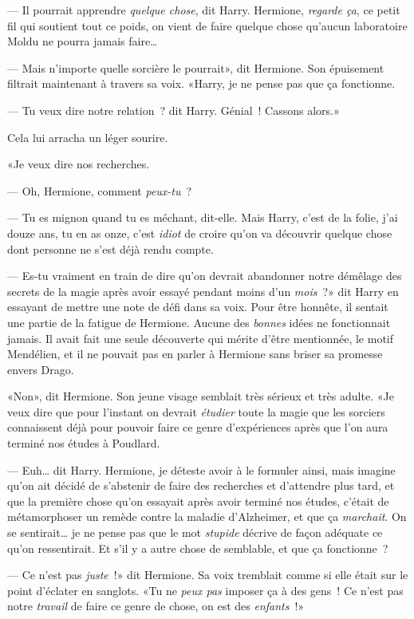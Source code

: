 --- Il pourrait apprendre \emph{quelque chose}, dit Harry. Hermione, \emph{regarde ça}, ce petit fil qui soutient tout ce poids, on vient de faire quelque chose qu'aucun laboratoire Moldu ne pourra jamais faire…

--- Mais n'importe quelle sorcière le pourrait», dit Hermione. Son épuisement filtrait maintenant à travers sa voix. «Harry, je ne pense pas que ça fonctionne.

--- Tu veux dire notre relation~? dit Harry. Génial~! Cassons alors.»

Cela lui arracha un léger sourire.

«Je veux dire nos recherches.

--- Oh, Hermione, comment \emph{peux-tu}~?

--- Tu es mignon quand tu es méchant, dit-elle. Mais Harry, c'est de la folie, j'ai douze ans, tu en as onze, c'est \emph{idiot} de croire qu'on va découvrir quelque chose dont personne ne s'est déjà rendu compte.

--- Es-tu vraiment en train de dire qu'on devrait abandonner notre démêlage des secrets de la magie après avoir essayé pendant moins d'un \emph{mois}~?» dit Harry en essayant de mettre une note de défi dans sa voix. Pour être honnête, il sentait une partie de la fatigue de Hermione. Aucune des \emph{bonnes} idées ne fonctionnait jamais. Il avait fait une seule découverte qui mérite d'être mentionnée, le motif Mendélien, et il ne pouvait pas en parler à Hermione sans briser sa promesse envers Drago.

«Non», dit Hermione. Son jeune visage semblait très sérieux et très adulte. «Je veux dire que pour l'instant on devrait \emph{étudier} toute la magie que les sorciers connaissent déjà pour pouvoir faire ce genre d'expériences après que l'on aura terminé nos études à Poudlard.

--- Euh… dit Harry. Hermione, je déteste avoir à le formuler ainsi, mais imagine qu'on ait décidé de s'abstenir de faire des recherches et d'attendre plus tard, et que la première chose qu'on essayait après avoir terminé nos études, c'était de métamorphoser un remède contre la maladie d'Alzheimer, et que ça \emph{marchait}. On se sentirait… je ne pense pas que le mot \emph{stupide} décrive de façon adéquate ce qu'on ressentirait. Et s'il y a autre chose de semblable, et que ça fonctionne~?

--- Ce n'est pas \emph{juste}~!» dit Hermione. Sa voix tremblait comme si elle était sur le point d'éclater en sanglots. «Tu ne \emph{peux pas} imposer ça à des gens~! Ce n'est pas notre \emph{travail} de faire ce genre de chose, on est des \emph{enfants}~!»

